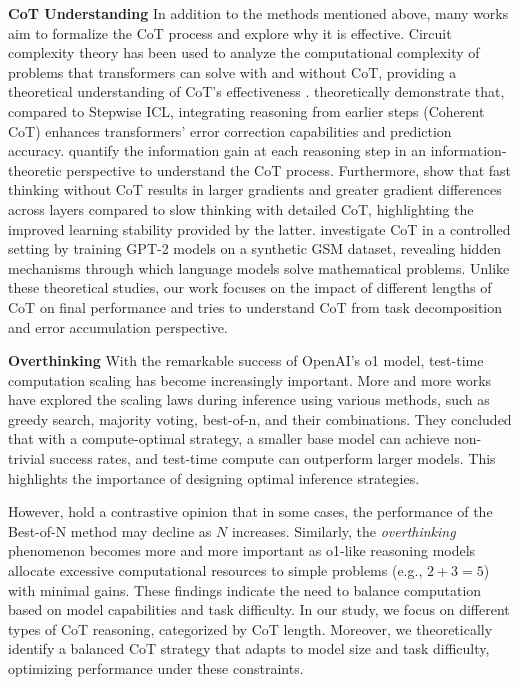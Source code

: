 \textbf{CoT Understanding}
In addition to the methods mentioned above, many works aim to formalize the CoT process and explore why it is effective. Circuit complexity theory has been used to analyze the computational complexity of problems that transformers can solve with and without CoT, providing a theoretical understanding of CoT's effectiveness \citep{cot-theory:wlw,cot-theory:tcs}. \citet{cot-theory:icl} theoretically demonstrate that, compared to Stepwise ICL, integrating reasoning from earlier steps (Coherent CoT) enhances transformers' error correction capabilities and prediction accuracy. \citet{cot-theory:infor-theory} quantify the information gain at each reasoning step in an information-theoretic perspective to understand the CoT process. Furthermore, \citet{cot-theory:gradient} show that fast thinking without CoT results in larger gradients and greater gradient differences across layers compared to slow thinking with detailed CoT, highlighting the improved learning stability provided by the latter. \citet{cot-theory:allen-zhu} investigate CoT in a controlled setting by training GPT-2 models on a synthetic GSM dataset, revealing hidden mechanisms through which language models solve mathematical problems. Unlike these theoretical studies, our work focuses on the impact of different lengths of CoT on final performance and tries to understand CoT from task decomposition and error accumulation perspective. 

\textbf{Overthinking}
With the remarkable success of OpenAI's o1 model, test-time computation scaling has become increasingly important. More and more works \citep{test-time:0,test-time:1,test-time:2,test-time:3} have explored the scaling laws during inference using various methods, such as greedy search, majority voting, best-of-n, and their combinations. They concluded that with a compute-optimal strategy, a smaller base model can achieve non-trivial success rates, and test-time compute can outperform larger models. This highlights the importance of designing optimal inference strategies. 

However, \citet{are-more-calls-you-need} hold a contrastive opinion that in some cases, the performance of the Best-of-N method may decline as \( N \) increases. Similarly, the \textit{overthinking} phenomenon \citep{2+3} becomes more and more important as o1-like reasoning models allocate excessive computational resources to simple problems (e.g., \( 2+3=5 \)) with minimal gains. These findings indicate the need to balance computation based on model capabilities and task difficulty. In our study, we focus on different types of CoT reasoning, categorized by CoT length. Moreover, we theoretically identify a balanced CoT strategy that adapts to model size and task difficulty, optimizing performance under these constraints.